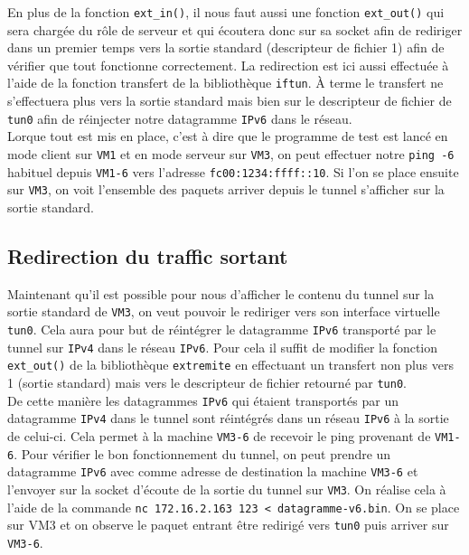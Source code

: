 \documentclass[a4paper, 12pt]{article}
\begin{document}
    En plus de la fonction \verb+ext_in()+, il nous faut aussi une fonction 
    \verb+ext_out()+ qui sera chargée du rôle de serveur et qui écoutera donc
    sur sa socket afin de rediriger dans un premier temps vers la sortie 
    standard (descripteur de fichier 1) afin de vérifier que tout fonctionne 
    correctement. La redirection est ici aussi effectuée à l'aide de la 
    fonction transfert de la bibliothèque \verb+iftun+. À terme le transfert ne
    s'effectuera plus vers la sortie standard mais bien sur le descripteur de 
    fichier de \verb+tun0+ afin de réinjecter notre datagramme \verb+IPv6+ dans
    le réseau. \\

    Lorque tout est mis en place, c'est à dire que le programme de test est
    lancé en mode client sur \verb+VM1+ et en mode serveur sur \verb+VM3+, on
    peut effectuer notre \verb+ping -6+ habituel depuis \verb+VM1-6+ vers 
    l'adresse \verb+fc00:1234:ffff::10+. Si l'on se place ensuite sur 
    \verb+VM3+, on voit l'ensemble des paquets arriver depuis le tunnel 
    s'afficher sur la sortie standard.

    \subsection{Redirection du traffic sortant}

    Maintenant qu'il est possible pour nous d'afficher le contenu du tunnel
    sur la sortie standard de \verb+VM3+, on veut pouvoir le rediriger vers son
    interface virtuelle \verb+tun0+. Cela aura pour but de réintégrer le 
    datagramme \verb+IPv6+ transporté par le tunnel sur \verb+IPv4+ dans le 
    réseau \verb+IPv6+. Pour cela il suffit de modifier la fonction 
    \verb+ext_out()+ de la bibliothèque \verb+extremite+ en effectuant un 
    transfert non plus vers 1 (sortie standard) mais vers le descripteur de
    fichier retourné par \verb+tun0+. \\

    De cette manière les datagrammes \verb+IPv6+ qui étaient transportés par un 
    datagramme \verb+IPv4+ dans le tunnel sont réintégrés dans un réseau 
    \verb+IPv6+ à la sortie de celui-ci. Cela permet à la machine \verb+VM3-6+ 
    de recevoir le ping provenant de \verb+VM1-6+. Pour vérifier le bon
    fonctionnement du tunnel, on peut prendre un datagramme \verb+IPv6+ avec
    comme adresse de destination la machine \verb+VM3-6+ et l'envoyer sur la
    socket d'écoute de la sortie du tunnel sur \verb+VM3+. On réalise cela à 
    l'aide de la commande \verb+nc 172.16.2.163 123 < datagramme-v6.bin+. On 
    se place sur VM3 et on observe le paquet entrant être redirigé vers 
    \verb+tun0+ puis arriver sur \verb+VM3-6+.
\end{document}
